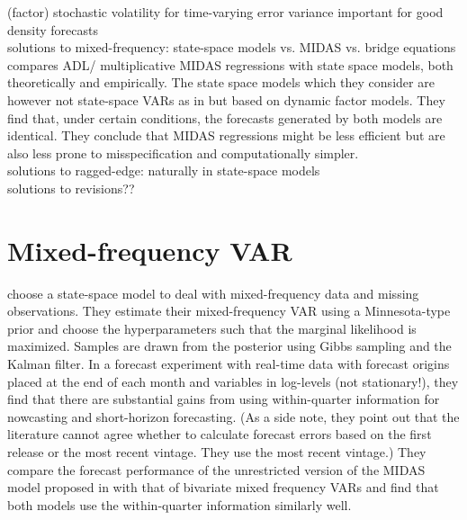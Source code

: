 \documentclass[12pt,a4paper]{scrartcl}
\begin{document}
(factor) stochastic volatility for time-varying error variance important for good density forecasts\\

solutions to mixed-frequency: state-space models vs. MIDAS vs. bridge equations \\

\citet{BaiEtal2013} compares ADL/ multiplicative MIDAS regressions \citep{???} with state space models, both theoretically and empirically. The state space models which they consider are however not state-space VARs as in \citet{SchorfheideSong2015} but based on dynamic factor models. They find that, under certain conditions, the forecasts generated by both models are identical. They conclude that MIDAS regressions might be less efficient but are also less prone to misspecification and computationally simpler.\\

solutions to ragged-edge: naturally in state-space models\\

solutions to revisions??

\section{Mixed-frequency VAR}

\citet{SchorfheideSong2015} choose a state-space model to deal with mixed-frequency data and missing observations. They estimate their mixed-frequency VAR using a Minnesota-type prior and choose the hyperparameters such that the marginal likelihood is maximized. Samples are drawn from the posterior using Gibbs sampling and the Kalman filter. In a forecast experiment with real-time data with forecast origins placed at the end of each month and variables in log-levels (not stationary!), they find that there are substantial gains from using within-quarter information for nowcasting and short-horizon forecasting. (As a side note, they point out that the literature cannot agree whether to calculate forecast errors based on the first release or the most recent vintage. They use the most recent vintage.) They compare the forecast performance of the unrestricted version of the MIDAS model proposed in \citet{ForoniEtal2015} with that of bivariate mixed frequency VARs and find that both models use the within-quarter information similarly well.\\
\end{document}
